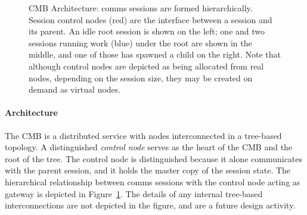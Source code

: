\begin{figure}
\begin{minipage}[b]{0.2\linewidth}
\end{minipage}
\hspace{0.5cm}
\begin{minipage}[b]{0.2\linewidth}
\end{minipage}
\hspace{0.5cm}
\begin{minipage}[b]{0.2\linewidth}
\end{minipage}
\hspace{0.5cm}
\begin{minipage}[b]{0.2\linewidth}
\end{minipage}
\caption{CMB Architecture:  comms sessions are formed hierarchically.
Session control nodes (red) are the interface between a session and its parent.
An idle root session is shown on the left; one and two sessions running 
work (blue) under the root are shown in the middle, and one of those has
spawned a child on the right.  Note that although control nodes are depicted
as being allocated from real nodes, depending on the session size, they may
be created on demand as virtual nodes.}
\label{FigCommsEx1}
\end{figure}

\paragraph{Architecture}
The CMB is a distributed service with nodes interconnected in a tree-based
topology.
A distinguished {\em control node} serves as the heart of the CMB
and the root of the tree.
The control node is distinguished because it alone communicates with
the parent session, and it holds the master copy of the session state.
The hierarchical relationship between comms sessions with the control
node acting as gateway is depicted in Figure~\ref{FigCommsEx1}.
The details of any internal tree-based interconnections
are not depicted in the figure, and are a future design activity.

